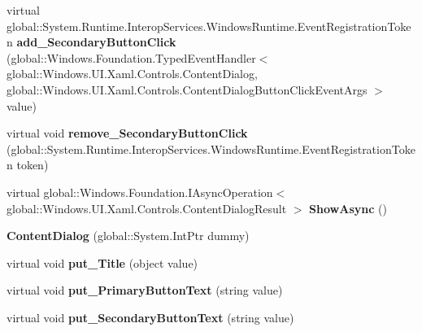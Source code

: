 \begin{DoxyCompactItemize}
virtual global\+::\+System.\+Runtime.\+Interop\+Services.\+Windows\+Runtime.\+Event\+Registration\+Token {\bfseries add\+\_\+\+Secondary\+Button\+Click} (global\+::\+Windows.\+Foundation.\+Typed\+Event\+Handler$<$ global\+::\+Windows.\+U\+I.\+Xaml.\+Controls.\+Content\+Dialog, global\+::\+Windows.\+U\+I.\+Xaml.\+Controls.\+Content\+Dialog\+Button\+Click\+Event\+Args $>$ value)
\item 
\mbox{\label{class_windows_1_1_u_i_1_1_xaml_1_1_controls_1_1_content_dialog_a3dfa1680cb30bf0dc1f3402bc879912e}} 
virtual void {\bfseries remove\+\_\+\+Secondary\+Button\+Click} (global\+::\+System.\+Runtime.\+Interop\+Services.\+Windows\+Runtime.\+Event\+Registration\+Token token)
\item 
\mbox{\label{class_windows_1_1_u_i_1_1_xaml_1_1_controls_1_1_content_dialog_acc6835ff256e59954bab47b9ce049071}} 
virtual global\+::\+Windows.\+Foundation.\+I\+Async\+Operation$<$ global\+::\+Windows.\+U\+I.\+Xaml.\+Controls.\+Content\+Dialog\+Result $>$ {\bfseries Show\+Async} ()
\item 
\mbox{\label{class_windows_1_1_u_i_1_1_xaml_1_1_controls_1_1_content_dialog_ac5cd215d832532c7377d5d28dc7c9e2f}} 
{\bfseries Content\+Dialog} (global\+::\+System.\+Int\+Ptr dummy)
\item 
\mbox{\label{class_windows_1_1_u_i_1_1_xaml_1_1_controls_1_1_content_dialog_a0a34b740496886293e402395da09194f}} 
virtual void {\bfseries put\+\_\+\+Title} (object value)
\item 
\mbox{\label{class_windows_1_1_u_i_1_1_xaml_1_1_controls_1_1_content_dialog_adcf99702d4b190842bce4c72ae4f8e60}} 
virtual void {\bfseries put\+\_\+\+Primary\+Button\+Text} (string value)
\item 
\mbox{\label{class_windows_1_1_u_i_1_1_xaml_1_1_controls_1_1_content_dialog_a0c1be8e4e5f2ada768536bad2d8ca78b}} 
virtual void {\bfseries put\+\_\+\+Secondary\+Button\+Text} (string value)

\end{DoxyCompactItemize}
